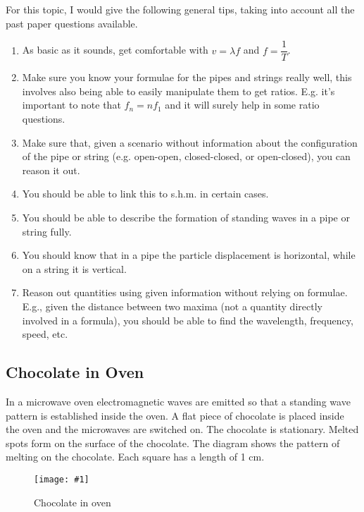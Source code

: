 \documentclass[a4paper,12pt]{article}
\newcommand{\img}[4]{\begin{center}
  \begin{figure}[H]
    \centering
    \texttt{[image: \#1]}
    \caption{#3}
    \label{fig:#4}
  \end{figure}
\end{center}}
\begin{document}
For this topic, I would give the following general tips, taking into account all the past paper questions available.
\begin{enumerate}
  \item As basic as it sounds, get comfortable with $v = \lambda f$ and $f = \dfrac{1}{T}$.
  \item Make sure you know your formulae for the pipes and strings really well, this involves also being able to easily manipulate them to get ratios. E.g. it's important to note that $f_n = nf_1$ and it will surely help in some ratio questions.
  \item Make sure that, given a scenario without information about the configuration of the pipe or string (e.g. open-open, closed-closed, or open-closed), you can reason it out.
  \item You should be able to link this to s.h.m. in certain cases.
  \item You should be able to describe the formation of standing waves in a pipe or string fully.
  \item You should know that in a pipe the particle displacement is horizontal, while on a string it is vertical.
  \item Reason out quantities using given information without relying on formulae. E.g., given the distance between two maxima (not a quantity directly involved in a formula), you should be able to find the wavelength, frequency, speed, etc.
\end{enumerate}

\pagebreak

\subsection{Chocolate in Oven}

In a microwave oven electromagnetic waves are emitted so that a standing wave
pattern is established inside the oven.
A flat piece of chocolate is placed inside the oven and the microwaves are
switched on. The chocolate is stationary.
Melted spots form on the surface of the chocolate. The diagram shows the
pattern of melting on the chocolate. Each square has a length of 1 cm.

\img{ex/1.png}{0.8}{Chocolate in oven}{chocolate}
\end{document}
